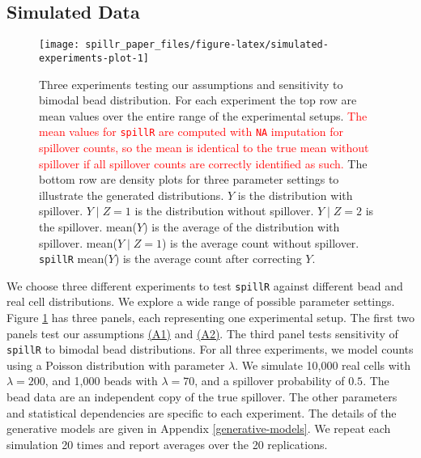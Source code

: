 \documentclass[
]{article}
\begin{document}
\subsection{Simulated Data}\label{simulated-data}

\begin{figure}

{\centering \texttt{[image: spillr\_paper\_files/figure-latex/simulated-experiments-plot-1]} 

}

\caption{Three experiments testing our assumptions and sensitivity to bimodal bead distribution. For each experiment the top row are mean values over the entire range of the experimental setups. \textcolor{red}{The mean values for \texttt{spillR} are computed with \texttt{NA} imputation for spillover counts, so the mean is identical to the true mean without spillover if all spillover counts are correctly identified as such.} The bottom row are density plots for three parameter settings to illustrate the generated distributions. $Y$ is the distribution with spillover. $Y \mid Z = 1$ is the distribution without spillover. $Y \mid Z = 2$ is the spillover. mean($Y$) is the average of the distribution with spillover. mean($Y \mid Z = 1$) is the average count without spillover. \texttt{spillR} mean($Y$) is the average count after correcting $Y$.}\label{fig:simulated-experiments-plot}
\end{figure}

We choose three different experiments to test \texttt{spillR} against different bead and real cell distributions. We explore a wide range of possible parameter settings. Figure \ref{fig:simulated-experiments-plot} has three panels, each representing one experimental setup. The first two panels test our assumptions \hyperref[assumption1]{(A1)} and \hyperref[assumption2]{(A2)}. The third panel tests sensitivity of \texttt{spillR} to bimodal bead distributions. For all three experiments, we model counts using a Poisson distribution with parameter \(\lambda\). We simulate 10,000 real cells with \(\lambda = 200\), and 1,000 beads with \(\lambda = 70\), and a spillover probability of \(0.5\). The bead data are an independent copy of the true spillover. The other parameters and statistical dependencies are specific to each experiment. The details of the generative models are given in Appendix \ref{generative-models}. We repeat each simulation 20 times and report averages over the 20 replications.
\end{document}
